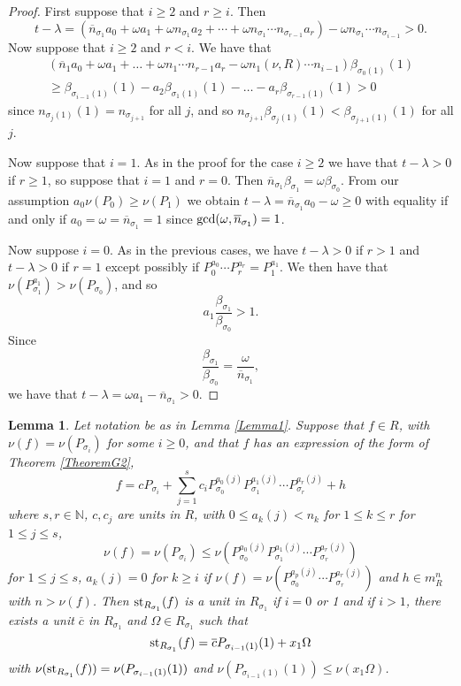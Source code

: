 \documentclass[11pt]{amsart}
\def\NZQ{\mathbb}               %
\def\NN{{\NZQ N}}
\newtheorem{Lemma}[Theorem]{Lemma}
\begin{document}
\begin{proof} First suppose that $i\ge 2$ and $r\ge i$.  Then 
$$
t-\lambda=(\overline n_{\sigma_1}a_0+\omega a_1+\omega n_{\sigma_1}a_2+\cdots +\omega n_{\sigma_1}\cdots n_{\sigma_{r-1}}a_r)-\omega n_{\sigma_1}\cdots n_{\sigma_{i-1}}>0.
$$
Now suppose that $i\ge 2$ and $r<i$.
We have that
$$
\begin{array}{l}
(\overline n_1a_0+\omega a_1+\ldots+\omega n_1\cdots n_{r-1}a_r-\omega n_1(\nu,R)\cdots n_{i-1})\beta_{\sigma_0(1)}(1)\\
\ge \beta_{\sigma_{i-1}(1)}(1)-a_2\beta_{\sigma_1(1)}(1)-\ldots-a_r\beta_{\sigma_{r-1}(1)}(1)>0
\end{array}
$$
since $n_{\sigma_j(1)}(1)=n_{\sigma_{j+1}}$ for all $j$, and so $n_{\sigma_{j+1}}\beta_{\sigma_j(1)}(1)<\beta_{\sigma_{j+1}(1)}(1)$ for all $j$. 

Now suppose that $i=1$. As in the proof for the case $i\ge 2$ we have that $t-\lambda>0$ if $r\ge 1$, so suppose that $i=1$ and $r=0$. Then $\overline n_{\sigma_1}\beta_{\sigma_1}=\omega \beta_{\sigma_0}$.
From our assumption $a_0\nu(P_0)\ge \nu(P_1)$ we obtain $t-\lambda=\overline n_{\sigma_1}a_0-\omega\ge 0$ with equality if and  only if $a_0=\omega=\overline n_{\sigma_1}=1$ since ${\rm gcd}(\omega,\overline n_{\sigma_1})=1$.

Now suppose $i=0$. As in the previous cases, we have $t-\lambda>0$ if $r>1$ and $t-\lambda>0$ if $r=1$ except possibly if  $P_0^{a_0}\cdots P_r^{a_r}=P_1^{a_1}$. We then have that $\nu(P_{\sigma_1}^{a_1})>\nu(P_{\sigma_0})$, and so
$$
a_1\frac{\beta_{\sigma_1}}{\beta_{\sigma_0}}>1.
$$
Since
$$
\frac{\beta_{\sigma_1}}{\beta_{\sigma_0}}=\frac{\omega}{\overline n_{\sigma_1}},
$$
we have that $t-\lambda=\omega a_1-\overline n_{\sigma_1}>0$. 


\end{proof}

\begin{Lemma}\label{Lemma2} Let notation be as in Lemma \ref{Lemma1}. Suppose that $f\in R$, with $\nu(f)=\nu(P_{\sigma_i})$ for some $i\ge 0$, and that $f$ has an expression of the form of Theorem \ref{TheoremG2}, 
$$
f=cP_{\sigma_i}+\sum_{j=1}^sc_iP_{\sigma_0}^{a_0(j)}P_{\sigma_1}^{a_1(j)}\cdots P_{\sigma_r}^{a_r(j)}+h
$$
where $s,r\in\NN$, $c, c_j$  are units in $R$, with $0\le a_k(j)<n_k$ for $1\le k\le r$ for $1\le j\le s$, 
$$
\nu(f)=\nu(P_{\sigma_i})\le \nu(P_{\sigma_0}^{a_0(j)}P_{\sigma_1}^{a_1(j)}\cdots P_{\sigma_r}^{a_r(j)})
$$
for $1\le j\le s$, $a_k(j)=0$ for $k\ge i$ if $\nu(f)=\nu(P_{\sigma_0}^{a_p(j)}\cdots P_{\sigma_r}^{a_r(j)})$
and $h\in  m_R^n$ with $n>\nu(f)$.
 Then 
${\rm st}_{R_{\sigma_1}}(f)$ is a unit in $R_{\sigma_1}$ if $i=0$ or 1 and if $i>1$,   there exists a unit $\overline c$ in $R_{\sigma_1}$ and $\Omega\in R_{\sigma_1}$ such that
$$
{\rm st}_{R_{\sigma_1}}(f)=\overline cP_{\sigma_{i-1}(1)}(1)+x_1\Omega
$$
with $\nu({\rm st}_{R_{\sigma_1}}(f))=\nu(P_{\sigma_{i-1}(1)}(1))$ and $\nu(P_{\sigma_{i-1}(1)}(1))\le\nu(x_1\Omega)$.
\end{Lemma}
\end{document}
